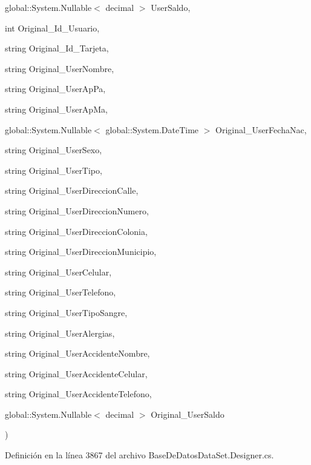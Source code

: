 {\begin{DoxyParamCaption}
\item[{global\-::\-System.\-Nullable$<$ decimal $>$}]{User\-Saldo, }
\item[{int}]{Original\-\_\-\-Id\-\_\-\-Usuario, }
\item[{string}]{Original\-\_\-\-Id\-\_\-\-Tarjeta, }
\item[{string}]{Original\-\_\-\-User\-Nombre, }
\item[{string}]{Original\-\_\-\-User\-Ap\-Pa, }
\item[{string}]{Original\-\_\-\-User\-Ap\-Ma, }
\item[{global\-::\-System.\-Nullable$<$ global\-::\-System.\-Date\-Time $>$}]{Original\-\_\-\-User\-Fecha\-Nac, }
\item[{string}]{Original\-\_\-\-User\-Sexo, }
\item[{string}]{Original\-\_\-\-User\-Tipo, }
\item[{string}]{Original\-\_\-\-User\-Direccion\-Calle, }
\item[{string}]{Original\-\_\-\-User\-Direccion\-Numero, }
\item[{string}]{Original\-\_\-\-User\-Direccion\-Colonia, }
\item[{string}]{Original\-\_\-\-User\-Direccion\-Municipio, }
\item[{string}]{Original\-\_\-\-User\-Celular, }
\item[{string}]{Original\-\_\-\-User\-Telefono, }
\item[{string}]{Original\-\_\-\-User\-Tipo\-Sangre, }
\item[{string}]{Original\-\_\-\-User\-Alergias, }
\item[{string}]{Original\-\_\-\-User\-Accidente\-Nombre, }
\item[{string}]{Original\-\_\-\-User\-Accidente\-Celular, }
\item[{string}]{Original\-\_\-\-User\-Accidente\-Telefono, }
\item[{global\-::\-System.\-Nullable$<$ decimal $>$}]{Original\-\_\-\-User\-Saldo}
\end{DoxyParamCaption}
)\hspace{0.3cm}{\ttfamily [virtual]}}\label{class_sim_b_u_s_1_1_base_de_datos_data_set_table_adapters_1_1_usuario_table_adapter_a3e0123c17e87e289fe8347be95886da8}


Definición en la línea 3867 del archivo Base\-De\-Datos\-Data\-Set.\-Designer.\-cs.


